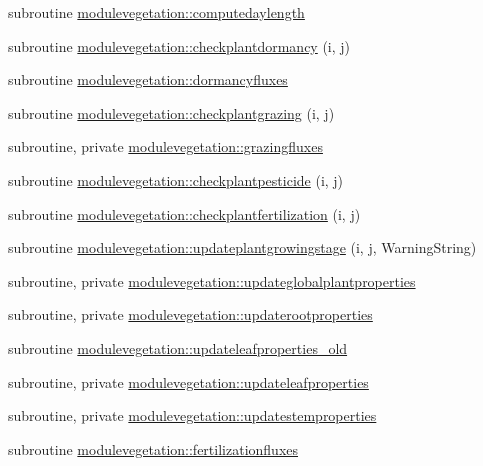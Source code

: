 \begin{DoxyCompactItemize}
\item 
subroutine \mbox{\hyperlink{namespacemodulevegetation_a722712ec8addb85933d86a2bc0fa41aa}{modulevegetation\+::computedaylength}}
\item 
subroutine \mbox{\hyperlink{namespacemodulevegetation_ad6c8bd7bf7ef1c60a031f3752ea5d26d}{modulevegetation\+::checkplantdormancy}} (i, j)
\item 
subroutine \mbox{\hyperlink{namespacemodulevegetation_a62a594d5a2ef5f37a2dcbc4db8507793}{modulevegetation\+::dormancyfluxes}}
\item 
subroutine \mbox{\hyperlink{namespacemodulevegetation_a4db38a1c2ca800ff349c72b3c0c01ce7}{modulevegetation\+::checkplantgrazing}} (i, j)
\item 
subroutine, private \mbox{\hyperlink{namespacemodulevegetation_a6171f7a4fbe04e9636476d638cf27f05}{modulevegetation\+::grazingfluxes}}
\item 
subroutine \mbox{\hyperlink{namespacemodulevegetation_aefcd4003ffaf332e5ccc9b2fabd54149}{modulevegetation\+::checkplantpesticide}} (i, j)
\item 
subroutine \mbox{\hyperlink{namespacemodulevegetation_afa2f07d94b35869067e9a8e4533df2fa}{modulevegetation\+::checkplantfertilization}} (i, j)
\item 
subroutine \mbox{\hyperlink{namespacemodulevegetation_a8f770924e5053c42aa7f57b5a6f5be05}{modulevegetation\+::updateplantgrowingstage}} (i, j, Warning\+String)
\item 
subroutine, private \mbox{\hyperlink{namespacemodulevegetation_ad4d9e32956110026543f678e37dd08e1}{modulevegetation\+::updateglobalplantproperties}}
\item 
subroutine, private \mbox{\hyperlink{namespacemodulevegetation_a508cd23535bbe150f1712dc11c562d65}{modulevegetation\+::updaterootproperties}}
\item 
subroutine \mbox{\hyperlink{namespacemodulevegetation_a61c0b056617116efb1cc8733f0f1fd09}{modulevegetation\+::updateleafproperties\+\_\+old}}
\item 
subroutine, private \mbox{\hyperlink{namespacemodulevegetation_a51955d069f261e54788d0be4185665b4}{modulevegetation\+::updateleafproperties}}
\item 
subroutine, private \mbox{\hyperlink{namespacemodulevegetation_ac544594c050d3fcb7a12971817350194}{modulevegetation\+::updatestemproperties}}
\item 
subroutine \mbox{\hyperlink{namespacemodulevegetation_a045ff1bdd58f618fc041e85a712080d6}{modulevegetation\+::fertilizationfluxes}}

\end{DoxyCompactItemize}
